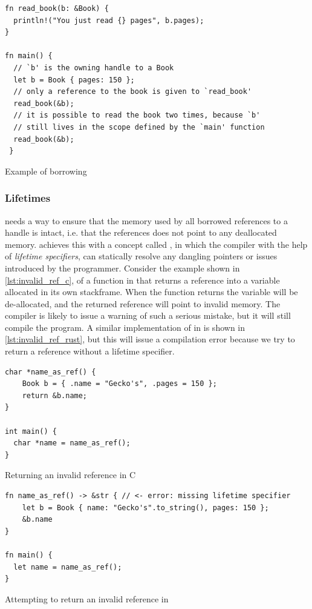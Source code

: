 \begin{listing}[tb]
\begin{verbatim}
fn read_book(b: &Book) {
  println!("You just read {} pages", b.pages);
}

fn main() {
  // `b' is the owning handle to a Book
  let b = Book { pages: 150 };
  // only a reference to the book is given to `read_book'
  read_book(&b);
  // it is possible to read the book two times, because `b'
  // still lives in the scope defined by the `main' function
  read_book(&b);
 }
\end{verbatim}
\caption{Example of borrowing}
\label{lst:borrowing_handle}
\end{listing}

\subsubsection{Lifetimes}
\label{ssec:lifetimes}

{\rust} needs a way to ensure that the memory used by all borrowed references to a handle is intact, i.e. that the references does not point to any deallocated memory.
{\rust} achieves this with a concept called , in which the compiler with the help of \emph{lifetime specifiers}, can statically resolve any dangling pointers or  issues introduced by the programmer.
Consider the example shown in \autoref{lst:invalid_ref_c}, of a function in {\C} that returns a reference into a variable allocated in its own stackframe.
When the function returns the variable will be de-allocated, and the returned reference will point to invalid memory.
The {\C} compiler is likely to issue a warning of such a serious mistake, but it will still compile the program.
A similar implementation of  in {\rust} is shown in \autoref{lst:invalid_ref_rust}, but this will issue a compilation error because we try to return a reference without a lifetime specifier.

\begin{listing}[tb]
\begin{verbatim}
char *name_as_ref() {
    Book b = { .name = "Gecko's", .pages = 150 };
    return &b.name;
}

int main() {
  char *name = name_as_ref();
}
\end{verbatim}
\caption{Returning an invalid reference in C}
\label{lst:invalid_ref_c}
\end{listing}

\begin{listing}[tb]
\begin{verbatim}
fn name_as_ref() -> &str { // <- error: missing lifetime specifier
    let b = Book { name: "Gecko's".to_string(), pages: 150 };
    &b.name
}

fn main() {
  let name = name_as_ref();
}
\end{verbatim}
\caption{Attempting to return an invalid reference in {\rust}}
\label{lst:invalid_ref_rust}
\end{listing}

